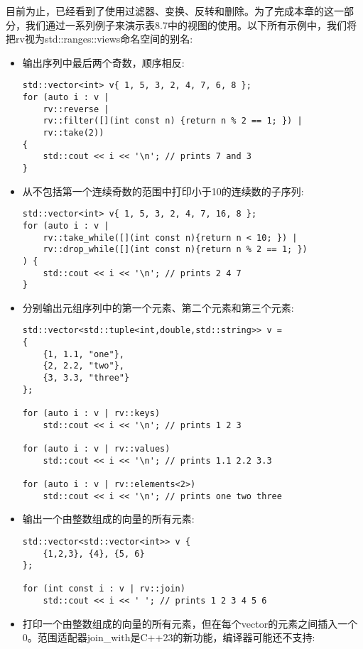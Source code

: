 目前为止，已经看到了使用过滤器、变换、反转和删除。为了完成本章的这一部分，我们通过一系列例子来演示表8.7中的视图的使用。以下所有示例中，我们将把rv视为std::ranges::views命名空间的别名:

\begin{itemize}
\item
输出序列中最后两个奇数，顺序相反:

\begin{lstlisting}[style=styleCXX]
std::vector<int> v{ 1, 5, 3, 2, 4, 7, 6, 8 };
for (auto i : v |
	rv::reverse |
	rv::filter([](int const n) {return n % 2 == 1; }) |
	rv::take(2))
{
	std::cout << i << '\n'; // prints 7 and 3
}
\end{lstlisting}

\item
从不包括第一个连续奇数的范围中打印小于10的连续数的子序列:

\begin{lstlisting}[style=styleCXX]
std::vector<int> v{ 1, 5, 3, 2, 4, 7, 16, 8 };
for (auto i : v |
	rv::take_while([](int const n){return n < 10; }) |
	rv::drop_while([](int const n){return n % 2 == 1; })
) {
	std::cout << i << '\n'; // prints 2 4 7
}
\end{lstlisting}

\item
分别输出元组序列中的第一个元素、第二个元素和第三个元素:

\begin{lstlisting}[style=styleCXX]
std::vector<std::tuple<int,double,std::string>> v =
{
	{1, 1.1, "one"},
	{2, 2.2, "two"},
	{3, 3.3, "three"}
};

for (auto i : v | rv::keys)
	std::cout << i << '\n'; // prints 1 2 3
	
for (auto i : v | rv::values)
	std::cout << i << '\n'; // prints 1.1 2.2 3.3
	
for (auto i : v | rv::elements<2>)
	std::cout << i << '\n'; // prints one two three
\end{lstlisting}

\item
输出一个由整数组成的向量的所有元素:

\begin{lstlisting}[style=styleCXX]
std::vector<std::vector<int>> v {
	{1,2,3}, {4}, {5, 6}
};

for (int const i : v | rv::join)
	std::cout << i << ' '; // prints 1 2 3 4 5 6
\end{lstlisting}

\item
打印一个由整数组成的向量的所有元素，但在每个vector的元素之间插入一个0。范围适配器join\_with是C++23的新功能，编译器可能还不支持:


\end{itemize}

